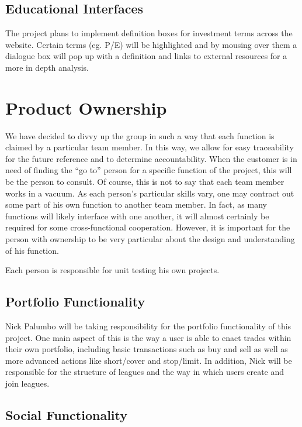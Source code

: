 \documentclass[11pt,letterpaper,oneside]{memoir}
\begin{document}
\section{Educational Interfaces}

The project plans to implement definition boxes for investment terms across the website.
Certain terms (eg. P/E) will be highlighted and by mousing over them a dialogue box will pop
up with a definition and links to external resources for a more in depth analysis.

\chapter{Product Ownership}

We have decided to divvy up the group in such a way that each function is claimed by a
particular team member. In this way, we allow for easy traceability for the future reference
and to determine accountability. When the customer is in need of finding the ``go to'' person for
a specific function of the project, this will be the person to consult. Of course, this
is not to say that each team member works in a vacuum. As each person's particular skills vary,
one may contract out some part of his own function to another team member. In fact, as many
functions will likely interface with one another, it will almost certainly be required for some
cross-functional cooperation. However, it is important for the person with ownership to be very
particular about the design and understanding of his function.

Each person is responsible for unit testing his own projects.

\section{Portfolio Functionality}
Nick Palumbo will be taking responsibility for the portfolio functionality of this project. One main
aspect of this is the way a user is able to enact trades within their own portfolio, including basic
transactions such as buy and sell as well as more advanced actions like short/cover and stop/limit.
In addition, Nick will be responsible for the structure of leagues and the way in which users create
and join leagues.

\section{Social Functionality}
\end{document}
